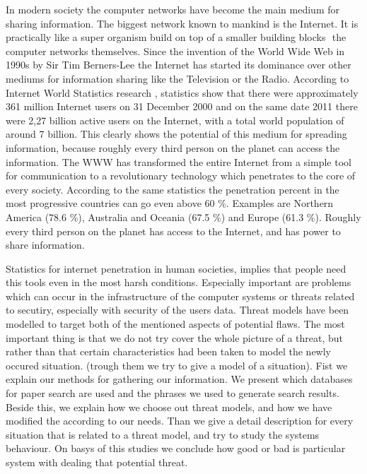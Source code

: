 In modern society the computer networks have become the main medium for sharing information. The  biggest network known to mankind is the Internet. It is practically like a super organism build on top of a smaller building blocks  the computer networks themselves. Since the invention of the World Wide Web in 1990s by Sir Tim Berners-Lee \cite{web:timbernerslee} the Internet has started its dominance over other mediums for information sharing like the Television or the Radio. According to Internet World Statistics research \cite{web: internetworldstats}, statistics show that there were approximately 361 million Internet users on 31 December 2000 and on the same date 2011 there were 2,27 billion active users on the Internet, with a total world population of around 7 billion. This clearly shows the potential of this medium for spreading information, because roughly every third person on the planet can access the information. The WWW has transformed the entire Internet from a simple tool for communication to a revolutionary technology which penetrates to the core of every society. According to the same statistics \cite{web:internetworldstats} the penetration percent in the most progressive countries can go even above 60 \%. Examples are Northern America (78.6 \%), Australia and Oceania (67.5 \%) and Europe (61.3 \%). Roughly every third person on the planet has access to the Internet, and has power to share information. 

Statistics for internet penetration in human societies, implies that people need this tools even in the most harsh conditions. Especially important are problems which can occur in the infrastructure of the computer systems or threats related to secutiry, especially with security of the users data. Threat models have been modelled to target both of the mentioned aspects of potential flaws. The most important thing is that we do not try cover the whole picture of a threat, but rather than that certain characteristics had been taken to model the newly occured situation. (trough them we try to give a model of a situation).
Fist we explain our methods for gathering our information. We present which databases for paper search are used and the phrases we used to generate search results. Beside this, we explain how we choose out threat models, and how we have modified the according to our needs. Than we give a detail description for every situation that is related to a threat model, and try to study the systems behaviour. On basys of this studies we conclude how good or bad is particular system with dealing that potential threat.
 
